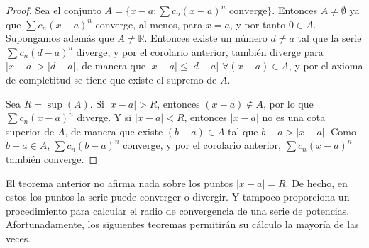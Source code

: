 \documentclass[
  a4paper,
]{scrreport}
\theoremstyle{definition}
\theoremstyle{plain}
\theoremstyle{definition}
\theoremstyle{definition}
\theoremstyle{plain}
\theoremstyle{plain}
\theoremstyle{remark}
\begin{document}
\begin{tcolorbox}[enhanced jigsaw, leftrule=.75mm, colbacktitle=quarto-callout-note-color!10!white, toprule=.15mm, opacityback=0, opacitybacktitle=0.6, toptitle=1mm, breakable, bottomtitle=1mm, colframe=quarto-callout-note-color-frame, rightrule=.15mm, titlerule=0mm, title=\textcolor{quarto-callout-note-color}{\faInfo}\hspace{0.5em}{Demostración}, arc=.35mm, left=2mm, bottomrule=.15mm, colback=white, coltitle=black]

\begin{proof}
Sea el conjunto \(A=\{x-a: \sum c_n(x-a)^n \mbox{ converge}\}\).
Entonces \(A\neq \emptyset\) ya que \(\sum c_n(x-a)^n\) converge, al
menos, para \(x=a\), y por tanto \(0\in A\). Supongamos además que
\(A\neq \mathbb{R}\). Entonces existe un número \(d\neq a\) tal que la
serie \(\sum c_n(d-a)^n\) diverge, y por el corolario anterior, también
diverge para \(|x-a|>|d-a|\), de manera que \(|x-a|\leq |d-a|\)
\(\forall (x-a) \in A\), y por el axioma de completitud se tiene que
existe el supremo de \(A\).

Sea \(R=\sup(A)\). Si \(|x-a|>R\), entonces \((x-a)\not\in A\), por lo
que \(\sum c_n(x-a)^n\) diverge. Y si \(|x-a|<R\), entonces \(|x-a|\) no
es una cota superior de \(A\), de manera que existe \((b-a)\in A\) tal
que \(b-a>|x-a|\). Como \(b-a\in A\), \(\sum c_n(b-a)^n\) converge, y
por el corolario anterior, \(\sum c_n(x-a)^n\) también converge.
\end{proof}

\end{tcolorbox}

\begin{tcolorbox}[enhanced jigsaw, leftrule=.75mm, colbacktitle=quarto-callout-warning-color!10!white, toprule=.15mm, opacityback=0, opacitybacktitle=0.6, toptitle=1mm, breakable, bottomtitle=1mm, colframe=quarto-callout-warning-color-frame, rightrule=.15mm, titlerule=0mm, title=\textcolor{quarto-callout-warning-color}{\faExclamationTriangle}\hspace{0.5em}{Advertencia}, arc=.35mm, left=2mm, bottomrule=.15mm, colback=white, coltitle=black]

El teorema anterior no afirma nada sobre los puntos \(|x-a|=R\). De
hecho, en estos los puntos la serie puede converger o divergir. Y
tampoco proporciona un procedimiento para calcular el radio de
convergencia de una serie de potencias. Afortunadamente, los siguientes
teoremas permitirán su cálculo la mayoría de las veces.

\end{tcolorbox}
\end{document}
